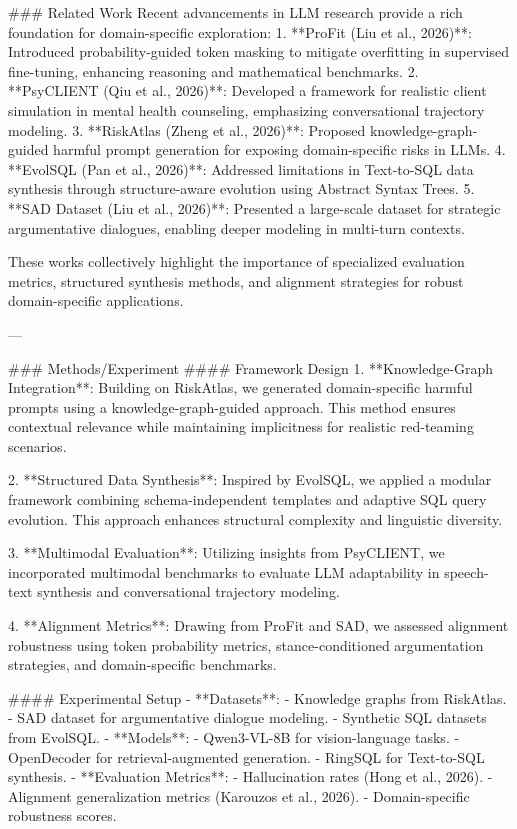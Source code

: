 ### Related Work
Recent advancements in LLM research provide a rich foundation for domain-specific exploration:
1. **ProFit (Liu et al., 2026)**: Introduced probability-guided token masking to mitigate overfitting in supervised fine-tuning, enhancing reasoning and mathematical benchmarks.
2. **PsyCLIENT (Qiu et al., 2026)**: Developed a framework for realistic client simulation in mental health counseling, emphasizing conversational trajectory modeling.
3. **RiskAtlas (Zheng et al., 2026)**: Proposed knowledge-graph-guided harmful prompt generation for exposing domain-specific risks in LLMs.
4. **EvolSQL (Pan et al., 2026)**: Addressed limitations in Text-to-SQL data synthesis through structure-aware evolution using Abstract Syntax Trees.
5. **SAD Dataset (Liu et al., 2026)**: Presented a large-scale dataset for strategic argumentative dialogues, enabling deeper modeling in multi-turn contexts.

These works collectively highlight the importance of specialized evaluation metrics, structured synthesis methods, and alignment strategies for robust domain-specific applications.

---

### Methods/Experiment
#### Framework Design
1. **Knowledge-Graph Integration**:
   Building on RiskAtlas, we generated domain-specific harmful prompts using a knowledge-graph-guided approach. This method ensures contextual relevance while maintaining implicitness for realistic red-teaming scenarios.

2. **Structured Data Synthesis**:
   Inspired by EvolSQL, we applied a modular framework combining schema-independent templates and adaptive SQL query evolution. This approach enhances structural complexity and linguistic diversity.

3. **Multimodal Evaluation**:
   Utilizing insights from PsyCLIENT, we incorporated multimodal benchmarks to evaluate LLM adaptability in speech-text synthesis and conversational trajectory modeling.

4. **Alignment Metrics**:
   Drawing from ProFit and SAD, we assessed alignment robustness using token probability metrics, stance-conditioned argumentation strategies, and domain-specific benchmarks.

#### Experimental Setup
- **Datasets**: 
  - Knowledge graphs from RiskAtlas.
  - SAD dataset for argumentative dialogue modeling.
  - Synthetic SQL datasets from EvolSQL.
- **Models**: 
  - Qwen3-VL-8B for vision-language tasks.
  - OpenDecoder for retrieval-augmented generation.
  - RingSQL for Text-to-SQL synthesis.
- **Evaluation Metrics**:
  - Hallucination rates (Hong et al., 2026).
  - Alignment generalization metrics (Karouzos et al., 2026).
  - Domain-specific robustness scores.

